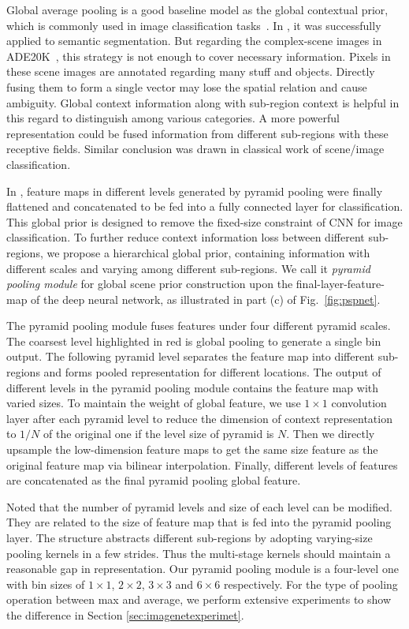 \documentclass[10pt,twocolumn,letterpaper]{article}
\begin{document}
Global average pooling is a good baseline model as the global contextual prior, which is
commonly used in image classification tasks~\cite{szegedy2015going,he2015deep}. In
\cite{liu2015parsenet}, it was successfully applied to semantic segmentation. But
regarding the complex-scene images in ADE20K~\cite{zhou2016semantic}, this strategy is
not enough to cover necessary information. Pixels in these scene images are annotated
regarding many stuff and objects. Directly fusing them to form a single vector may lose
the spatial relation and cause ambiguity. Global context information along with
sub-region context is helpful in this regard to distinguish among various categories. A
more powerful representation could be fused information from different sub-regions with
these receptive fields. Similar conclusion was drawn in classical work
\cite{lazebnik2006beyond,he2014spatial} of scene/image classification.

In \cite{he2014spatial}, feature maps in different levels generated by pyramid pooling
were finally flattened and concatenated to be fed into a fully connected layer for
classification. This global prior is designed to remove the fixed-size constraint of CNN
for image classification. To further reduce context information loss between different
sub-regions, we propose a hierarchical global prior, containing information with
different scales and varying among different sub-regions. We call it {\it pyramid pooling
module} for global scene prior construction upon the final-layer-feature-map of the deep
neural network, as illustrated in part (c) of Fig.~\ref{fig:pspnet}.

The pyramid pooling module fuses features under four different pyramid scales. The
coarsest level highlighted in red is global pooling to generate a single bin output. The
following pyramid level separates the feature map into different sub-regions and forms
pooled representation for different locations. The output of different levels in the
pyramid pooling module contains the feature map with varied sizes. To maintain the weight
of global feature, we use $1\times 1$ convolution layer after each pyramid level to
reduce the dimension of context representation to $1/N$ of the original one if the level
size of pyramid is $N$. Then we directly upsample the low-dimension feature maps to
get the same size feature as the original feature map via bilinear
interpolation. Finally, different levels of features are concatenated as the final
pyramid pooling global feature.

Noted that the number of pyramid levels and size of each level can be modified. They are
related to the size of feature map that is fed into the pyramid pooling layer. The
structure abstracts different sub-regions by adopting varying-size pooling kernels in a
few strides. Thus the multi-stage kernels should maintain a reasonable gap in
representation. Our pyramid pooling module is a four-level one with bin sizes of $1\times
1$, $2\times 2$, $3\times 3$ and $6\times 6$ respectively. For the type of pooling
operation between max and average, we perform extensive experiments to show the
difference in Section \ref{sec:imagenetexperimet}.
\end{document}
